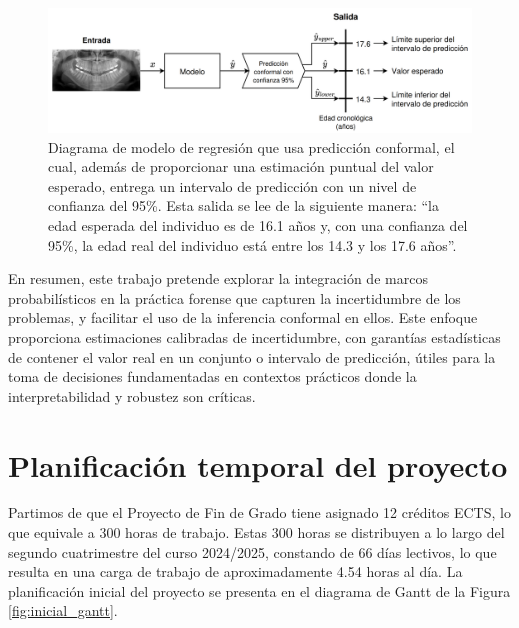 \begin{figure}[h]
    \centering
    \includegraphics[width=\textwidth]{capitulos/cap_01/imagenes/example_intervalic_estimation.png}
    \caption[
        Diagrama de modelo de regresión que usa predicción conformal, el cual, además de proporcionar una estimación puntual del valor esperado, entrega un intervalo de predicción con un nivel de confianza del 95\%.
    ]{ 
        Diagrama de modelo de regresión que usa predicción conformal, el cual, además de proporcionar una estimación puntual del valor esperado, entrega un intervalo de predicción con un nivel de confianza del 95\%.
        Esta salida se lee de la siguiente manera: ``la edad esperada del individuo es de 16.1 años y, con una confianza del 95\%, la edad real del individuo está entre los 14.3 y los 17.6 años''.
    } 
    \label{fig:example_intervalic_estimation}
\end{figure}


En resumen, este trabajo pretende explorar la integración de marcos probabilísticos en la práctica forense que capturen la incertidumbre de los problemas, y facilitar el uso de la inferencia conformal en ellos. Este enfoque proporciona estimaciones calibradas de incertidumbre, con garantías estadísticas de contener el valor real en un conjunto o intervalo de predicción, útiles para la toma de decisiones fundamentadas en contextos prácticos donde la interpretabilidad y robustez son críticas.


\section{Planificación temporal del proyecto}

Partimos de que el Proyecto de Fin de Grado tiene asignado 12 créditos ECTS, lo que equivale a 300 horas de trabajo. Estas 300 horas se distribuyen a lo largo del segundo cuatrimestre del curso 2024/2025, constando de 66 días lectivos, lo que resulta en una carga de trabajo de aproximadamente 4.54 horas al día. La planificación inicial del proyecto se presenta en el diagrama de Gantt de la Figura \ref{fig:inicial_gantt}.

